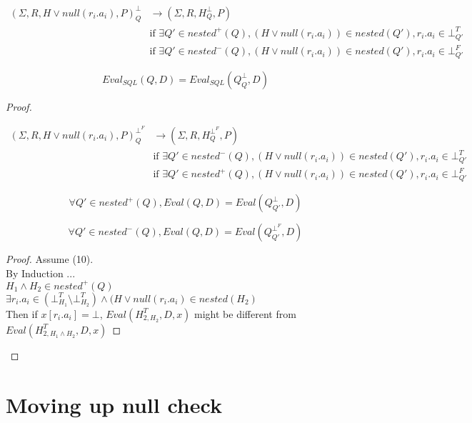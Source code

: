 \begin{mydef}
	\begin{align*}
		(\Sigma,R,H \lor null(r_i.a_i),P)^\bot_Q & \rightarrow (\Sigma,R,H^\bot_{Q},P) \\
		& \mbox{if } \exists Q' \in nested^+(Q), (H\lor null(r_i.a_i)) \in nested(Q'), r_i.a_i \in \bot^T_{Q'} \\
		& \mbox{if } \exists Q' \in nested^-(Q), (H\lor null(r_i.a_i)) \in nested(Q'), r_i.a_i \in \bot^F_{Q'}
	\end{align*}
\end{mydef}



\begin{myprop}
	$$Eval_{SQL}(Q,D) = Eval_{SQL}(Q^\bot_Q,D)$$
\end{myprop}

\begin{proof}
	
	\begin{mydef}
		\begin{align*}
			(\Sigma,R,H \lor null(r_i.a_i),P)^{\bot^F}_Q & \rightarrow (\Sigma,R,H^{\bot^F}_{Q},P) \\
			& \mbox{if } \exists Q' \in nested^-(Q), (H\lor null(r_i.a_i)) \in nested(Q'), r_i.a_i \in \bot^T_{Q'} \\
			& \mbox{if } \exists Q' \in nested^+(Q), (H\lor null(r_i.a_i)) \in nested(Q'), r_i.a_i \in \bot^F_{Q'}
		\end{align*}
	\end{mydef}
	
	\begin{myprop}
		$$\forall Q' \in nested^+(Q), Eval(Q,D) = Eval(Q^\bot_{Q'},D)$$
	\end{myprop}
	\begin{myprop}
		$$\forall Q' \in nested^-(Q), Eval(Q,D) = Eval(Q^{\bot^F}_{Q'},D)$$
	\end{myprop}
	
	\begin{proof}
		Assume (10).
		\\By Induction ...
		\\$H_1 \land H_2 \in nested^+(Q)$
		\\$\exists r_i.a_i \in (\bot^T_{H_1} \setminus \bot^T_{H_2}) \land (H\lor null(r_i.a_i)\in nested(H_2)$
		\\Then if $x[r_i.a_i] = \bot$, $Eval(H^T_{2,H_2},D,x)$ might be different from $Eval(H^T_{2,H_1\land H_2},D,x)$
	\end{proof}
	
	
\end{proof}

\begin{myprop}
	
\end{myprop}

\section{Moving up null check}